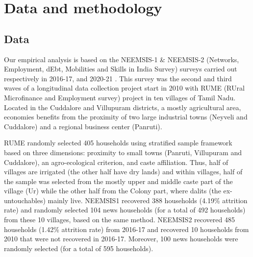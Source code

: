 \documentclass[a4paper, 11pt, onecolumn]{article}
\begin{document}










\newpage
\section{Data and methodology}


	\subsection{Data}

Our empirical analysis is based on the NEEMSIS-1 \& NEEMSIS-2 (Networks, Employment, dEbt, Mobilities and Skills in India Survey) surveys carried out respectively in 2016-17, and 2020-21 \citep{NEEMSISreport, NEEMSIS2017}.
This survey was the second and third waves of a longitudinal data collection project start in 2010 with RUME (RUral Microfinance and Employment survey) project in ten villages of Tamil Nadu.
Located in the Cuddalore and Villupuram districts, a mostly agricultural area, economies benefits from the proximity of two large industrial towns (Neyveli and Cuddalore) and a regional business center (Panruti).

RUME randomly selected 405 households using stratified sample framework based on three dimensions: proximity to small towns (Panruti, Villupuram and Cuddalore), an agro-ecological criterion, and caste affiliation.
Thus, half of villages are irrigated (the other half have dry lands) and within villages, half of the sample was selected from the mostly upper and middle caste part of the village (Ur) while the other half from the Colony part, where dalits (the ex-untouchables)  mainly live. 
NEEMSIS1 recovered 388 households (4.19\% attrition rate) and randomly selected 104 news households (for a total of 492 households) from these 10 villages, based on the same method. 
NEEMSIS2 recovered 485 households (1.42\% attrition rate) from 2016-17 and recovered 10 households from 2010 that were not recovered in 2016-17.
Moreover, 100 news households were randomly selected (for a total of 595 households).
\end{document}
